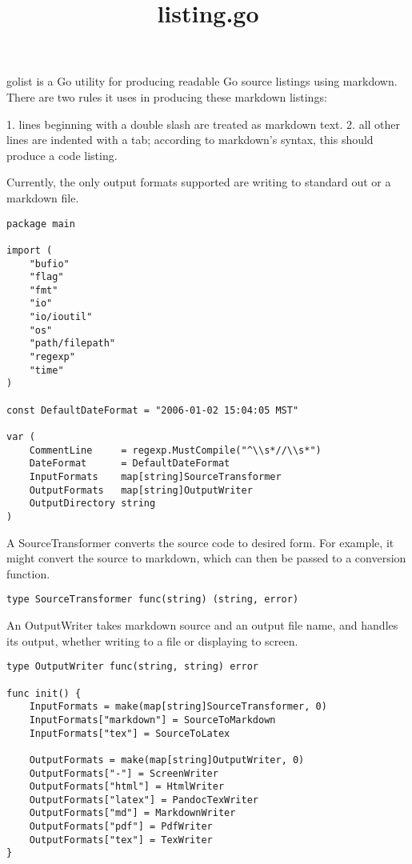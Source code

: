 \documentclass[11pt]{article}
\title{listing.go}
\begin{document}
\maketitle

golist is a Go utility for producing readable Go source listings
using markdown. There are two rules it uses in producing these
markdown listings:

1. lines beginning with a double slash are treated as markdown text.
2. all other lines are indented with a tab; according to markdown's
syntax, this should produce a code listing.

Currently, the only output formats supported are writing to standard out
or a markdown file.


\begin{verbatim}
package main

import (
	"bufio"
	"flag"
	"fmt"
	"io"
	"io/ioutil"
	"os"
	"path/filepath"
	"regexp"
	"time"
)

const DefaultDateFormat = "2006-01-02 15:04:05 MST"

var (
	CommentLine     = regexp.MustCompile("^\\s*//\\s*")
	DateFormat      = DefaultDateFormat
	InputFormats    map[string]SourceTransformer
	OutputFormats   map[string]OutputWriter
	OutputDirectory string
)

\end{verbatim}

A SourceTransformer converts the source code to desired form. For example,
it might convert the source to markdown, which can then be passed to a
conversion function.


\begin{verbatim}
type SourceTransformer func(string) (string, error)

\end{verbatim}

An OutputWriter takes markdown source and an output file name, and
handles its output, whether writing to a file or displaying to screen.


\begin{verbatim}
type OutputWriter func(string, string) error

func init() {
	InputFormats = make(map[string]SourceTransformer, 0)
	InputFormats["markdown"] = SourceToMarkdown
	InputFormats["tex"] = SourceToLatex

	OutputFormats = make(map[string]OutputWriter, 0)
	OutputFormats["-"] = ScreenWriter
	OutputFormats["html"] = HtmlWriter
	OutputFormats["latex"] = PandocTexWriter
	OutputFormats["md"] = MarkdownWriter
	OutputFormats["pdf"] = PdfWriter
	OutputFormats["tex"] = TexWriter
}

\end{verbatim}
\end{document}
